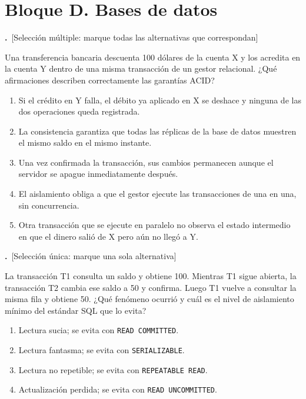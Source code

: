 \documentclass[11pt,a4paper]{article}
\newif\ifclave
\newcounter{preg}
\newcommand{\tipounica}{\textcolor{uteqMid}{\small\textsf{[Selección única: marque una sola alternativa]}}}
\newcommand{\tipomultiple}{\textcolor{uteqAmber!80!black}{\small\textsf{[Selección múltiple: marque todas las alternativas que correspondan]}}}
\newcommand{\pregunta}[2]{%
	\refstepcounter{preg}%
	\par\medskip
	\noindent\textbf{\color{uteqBlue}\arabic{preg}.}~#1\par
	\noindent #2\par\nopagebreak
}
\newcommand{\ok}{\ifclave~\textcolor{uteqGreen}{\ding{51}~\textbf{Correcta}}\fi}
\newenvironment{opciones}{%
	\begin{enumerate}[label={$\square$\ \alph*)},leftmargin=2.6em,itemsep=1pt,topsep=2pt]
}{%
	\end{enumerate}
}
\newcommand{\just}[1]{%
	\ifclave
		\begin{tcolorbox}[colback=uteqGreen!6,colframe=uteqGreen!70!black,boxrule=0.4pt,arc=1mm,left=4pt,right=4pt,top=2pt,bottom=2pt,fontupper=\small]
			\textbf{Justificación:} #1
		\end{tcolorbox}
	\fi
}
\begin{document}
\section*{\color{uteqBlue}\large Bloque D. Bases de datos}

\pregunta{\tipomultiple}{Una transferencia bancaria descuenta 100 dólares de la cuenta X y los acredita en la cuenta Y dentro de una misma transacción de un gestor relacional. ¿Qué afirmaciones describen correctamente las garantías ACID?}
\begin{opciones}
	\item Si el crédito en Y falla, el débito ya aplicado en X se deshace y ninguna de las dos operaciones queda registrada.\ok
	\item La consistencia garantiza que todas las réplicas de la base de datos muestren el mismo saldo en el mismo instante.
	\item Una vez confirmada la transacción, sus cambios permanecen aunque el servidor se apague inmediatamente después.\ok
	\item El aislamiento obliga a que el gestor ejecute las transacciones de una en una, sin concurrencia.
	\item Otra transacción que se ejecute en paralelo no observa el estado intermedio en que el dinero salió de X pero aún no llegó a Y.\ok
\end{opciones}
\just{Las alternativas a), c) y e) describen atomicidad, durabilidad y aislamiento. La C de ACID se refiere al respeto de las reglas de integridad de la base, no a la igualdad entre réplicas (esa idea corresponde a la C del teorema CAP, que se estudiará en el curso). El aislamiento se logra mediante bloqueos o versiones y permite concurrencia; la ejecución en serie es solo una forma de razonarlo \cite{berenson1995critique}.}

\pregunta{\tipounica}{La transacción T1 consulta un saldo y obtiene 100. Mientras T1 sigue abierta, la transacción T2 cambia ese saldo a 50 y confirma. Luego T1 vuelve a consultar la misma fila y obtiene 50. ¿Qué fenómeno ocurrió y cuál es el nivel de aislamiento mínimo del estándar SQL que lo evita?}
\begin{opciones}
	\item Lectura sucia; se evita con \texttt{READ COMMITTED}.
	\item Lectura fantasma; se evita con \texttt{SERIALIZABLE}.
	\item Lectura no repetible; se evita con \texttt{REPEATABLE READ}.\ok
	\item Actualización perdida; se evita con \texttt{READ UNCOMMITTED}.
\end{opciones}
\just{T1 leyó dos veces la misma fila con resultados diferentes debido a un cambio confirmado por otra transacción: lectura no repetible, que \texttt{REPEATABLE READ} impide \cite{berenson1995critique}. No es lectura sucia porque T2 había confirmado; no es fantasma porque no aparecen filas nuevas; \texttt{READ UNCOMMITTED} no evita ninguna anomalía.}
\end{document}
